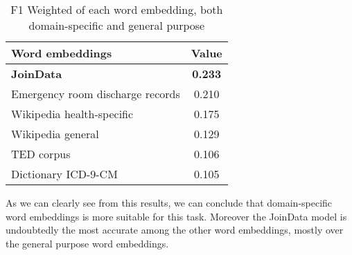 \begin{table}[h!]
	\begin{center}
		\caption[F1 Weighted of each word embedding, both domain-specific and general purpose]{F1 Weighted of each word embedding, both domain-specific and general purpose}
		\label{tab:tableF1Weighted}
		\begin{tabular}{l|S}
			\toprule
			\textbf{Word embeddings} & \textbf{Value} \\
			\midrule
			\textbf{JoinData} & \textbf{0.233}  \\
			Emergency room discharge records & 0.210 \\
			Wikipedia health-specific & 0.175  \\
			Wikipedia general & 0.129 \\
			TED corpus & 0.106  \\
			Dictionary ICD-9-CM & 0.105  \\
			\bottomrule
		\end{tabular}
	\end{center}
\end{table}

As we can clearly see from this results, we can conclude that domain-specific word embeddings is more suitable for this task. Moreover the JoinData model is undoubtedly the most accurate among the other word embeddings, mostly over the general purpose word embeddings.